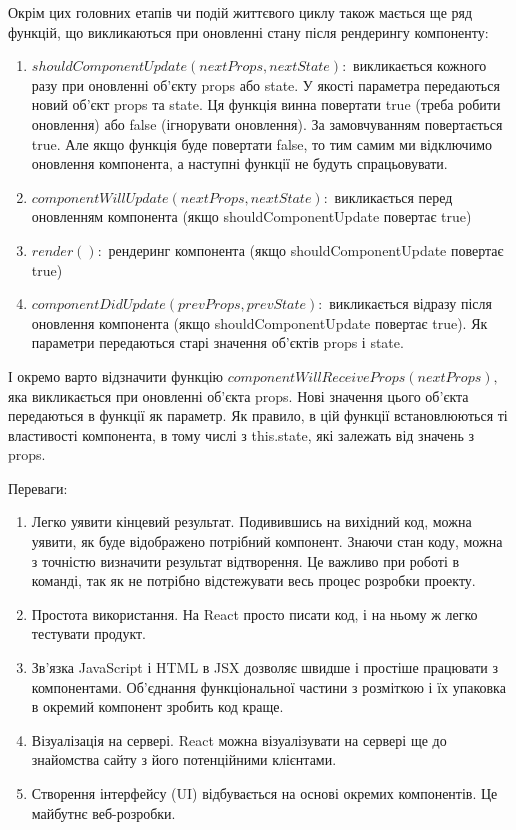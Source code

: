 Окрім цих головних етапів чи подій життєвого циклу також мається ще ряд функцій, що викликаються при оновленні стану після рендерингу компоненту:

\begin{enumerate}
    \item $shouldComponentUpdate(nextProps, nextState):$ викликається кожного разу при оновленні об'єкту props або state. У якості параметра передаються новий об'єкт props та state. Ця функція винна повертати true (треба робити оновлення) або false (ігнорувати оновлення). За замовчуванням повертається true. Але якщо функція буде повертати false, то тим самим ми відключимо оновлення компонента, а наступні функції не будуть спрацьовувати.
    \item $componentWillUpdate (nextProps, nextState):$ викликається перед оновленням компонента (якщо shouldComponentUpdate повертає true)
    \item $render ():$ рендеринг компонента (якщо shouldComponentUpdate повертає true)
    \item $componentDidUpdate (prevProps, prevState):$ викликається відразу після оновлення компонента (якщо shouldComponentUpdate повертає true). Як параметри передаються старі значення об'єктів props і state.
\end{enumerate}

І окремо варто відзначити функцію $componentWillReceiveProps(nextProps),$ яка викликається при оновленні об'єкта props. Нові значення цього об'єкта передаються в функції як параметр. Як правило, в цій функції встановлюються ті властивості компонента, в тому числі з this.state, які залежать від значень з props.

Переваги:
\begin{enumerate}
    \item Легко уявити кінцевий результат. Подивившись на вихідний код, можна уявити, як буде відображено потрібний компонент. Знаючи стан коду, можна з точністю визначити результат відтворення. Це важливо при роботі в команді, так як не потрібно відстежувати весь процес розробки проекту.
    \item Простота використання. На React просто писати код, і на ньому ж легко тестувати продукт.
    \item Зв'язка JavaScript і HTML в JSX дозволяє швидше і простіше працювати з компонентами. Об'єднання функціональної частини з розміткою і їх упаковка в окремий компонент зробить код краще.
    \item Візуалізація на сервері. React можна візуалізувати на сервері ще до знайомства сайту з його потенційними клієнтами.
    \item Створення інтерфейсу (UI) відбувається на основі окремих компонентів. Це майбутнє веб-розробки.
    
\end{enumerate}

